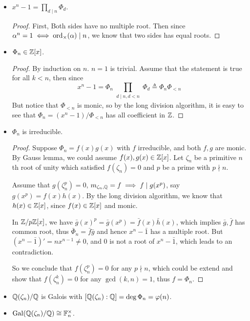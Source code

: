 \begin{prop} \hfill
  \begin{itemize}
    \item $x^n - 1 = \prod_{d \mid n} \Phi_d$.
      \begin{proof}
        First, Both sides have no multiple root. Then since $\alpha^n = 1 \iff \operatorname{ord}_{\times}(\alpha) \mid n$,
        we know that two sides has equal roots.
      \end{proof}
    \item $\Phi_n \in \mathbb{Z}[x]$.
      \begin{proof}
        By induction on $n$. $n = 1$ is trivial.
        Assume that the statement is true for all $k < n$, then since
        \[ x^n - 1 = \Phi_n \prod_{\substack{d \mid n, d < n}} \Phi_d \triangleq \Phi_n \Phi_{< n} \]
        But notice that $\Phi_{<n}$ is monic, so by the long division algorithm, it is easy to
        see that $\Phi_n = (x^n - 1) / \Phi_{<n}$ has all coefficient in $\mathbb{Z}$.
      \end{proof}
    \item $\Phi_n$ is irreducible.
      \begin{proof}
        Suppose $\Phi_n = f(x) g(x)$ with $f$ irreducible, and both $f, g$ are monic.
        By Gauss lemma, we could assume $f(x), g(x) \in \mathbb{Z}[x]$.
        Let $\zeta_n$ be a primitive $n$th root of unity which satisfied $f(\zeta_n) = 0$
        and $p$ be a prime with $p \nmid n$.

        Assume that $g(\zeta_n^p) = 0$, $m_{\zeta_n, \mathbb{Q}} = f \implies f \mid g(x^p)$,
        say $g(x^p) = f(x) h(x)$.
        By the long division algorithm, we know that $h(x) \in \mathbb{Z}[x]$, since $f(x) \in \mathbb{Z}[x]$
        and monic.

        In $\mathbb{Z} / p\mathbb{Z}[x]$, we have $\bar{g}(x)^p = \bar{g}(x^p) = \bar{f}(x) \bar{h}(x)$,
        which implies $\bar{g}, \bar{f}$ has common root, thus $\bar\Phi_n = \bar{f}\bar{g}$ and
        hence $x^n - \bar{1}$ has a multiple root.
        But $(x^n - \bar{1})' = nx^{n-1} \neq 0$, and $0$ is not a root of $x^n - \bar{1}$,
        which leads to an contradiction.

        So we conclude that $f(\zeta_n^p) = 0$ for any $p \nmid n$, which could be extend
        and show that $f(\zeta_n^k) = 0$ for any $\gcd(k, n) = 1$, thus $f = \Phi_n$.
      \end{proof}
    \item $\mathbb{Q}(\zeta_n) / \mathbb{Q}$ is Galois with $[\mathbb{Q}(\zeta_n): \mathbb{Q}] = \deg \Phi_n = \varphi(n)$.
    \item $\operatorname{Gal}(\mathbb{Q}(\zeta_n) / \mathbb{Q}) \cong \mathbb{F}_n^\times$.


\end{itemize}
\end{prop}
